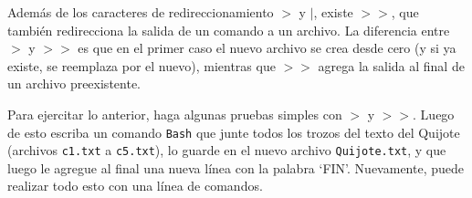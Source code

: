 \documentclass[11pt]{exam}
\begin{document}
\begin{questions}
\item Además de los caracteres de redireccionamiento $>$ y $\vert$, existe $>>$, que también redirecciona la salida de un comando a un archivo. La diferencia entre $>$ y $>>$ es que en el primer caso el nuevo archivo se crea desde cero (y si ya existe, se reemplaza por el nuevo), mientras que $>>$ agrega la salida al final de un archivo preexistente.

Para ejercitar lo anterior, haga algunas pruebas simples con $>$ y $>>$. Luego de esto escriba un comando \texttt{Bash} que junte todos los trozos del texto del Quijote (archivos \texttt{c1.txt} a \texttt{c5.txt}), lo guarde en el nuevo archivo \texttt{Quijote.txt},   y que luego le agregue al final una nueva línea con la palabra `FIN'. Nuevamente, puede realizar todo esto con una línea de comandos.

\end{questions}
\end{document}
